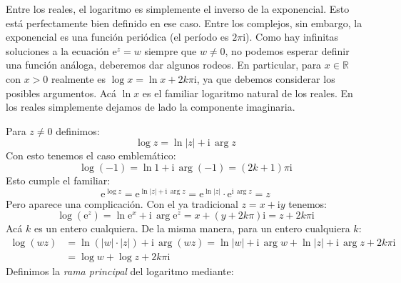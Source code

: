   Entre los reales,
  el logaritmo es simplemente el inverso de la exponencial.
  Esto está perfectamente bien definido en ese caso.
  Entre los complejos,
  sin embargo,
  la exponencial es una función periódica
  (el período es \(2 \pi \mathrm{i}\)).
  Como hay infinitas soluciones a la ecuación \(\mathrm{e}^z = w\)
  siempre que \(w \ne 0\),
  no podemos esperar definir una función análoga,
  deberemos dar algunos rodeos.
  En particular,
  para \(x \in \mathbb{R}\) con \(x > 0\)
  realmente es \(\log x = \ln x + 2 k \pi \mathrm{i}\),%
  ya que debemos considerar los posibles argumentos.
  Acá \(\ln x\) es el familiar logaritmo natural de los reales.
  En los reales
  simplemente dejamos de lado la componente imaginaria.

  Para \(z \ne 0\) definimos:
  \begin{equation}
    \label{eq:log-definition}
    \log z
      = \ln \lvert z \rvert + \mathrm{i} \, \arg z
  \end{equation}
  Con esto tenemos el caso emblemático:
  \begin{equation*}
    \log(-1)
      = \ln 1 + \mathrm{i} \, \arg(-1)
      = (2 k + 1) \pi \mathrm{i}
  \end{equation*}
  Esto cumple el familiar:
  \begin{equation*}
    \mathrm{e}^{\log z}
      = \mathrm{e}^{\ln \lvert z \rvert + \mathrm{i} \, \arg z}
      = \mathrm{e}^{\ln \lvert z \rvert}
	  \cdot \mathrm{e}^{\mathrm{i} \, \arg z}
      = z
  \end{equation*}
  Pero aparece una complicación.
  Con el ya tradicional \(z = x + \mathrm{i} y\) tenemos:
  \begin{equation*}
    \log \left( \mathrm{e}^z \right)
      = \ln \mathrm{e}^x + \mathrm{i} \, \arg \mathrm{e}^z
      = x + (y + 2 k \pi) \mathrm{i}
      = z + 2 k \pi \mathrm{i}
  \end{equation*}
  Acá \(k\) es un entero cualquiera.
  De la misma manera,
  para un entero cualquiera \(k\):
  \begin{align*}
    \log (w z)
      &= \ln (\lvert w \rvert \cdot \lvert z \rvert)
	   + \mathrm{i} \, \arg (w z)
       = \ln \lvert w \rvert + \mathrm{i} \, \arg w
	   + \ln \lvert z \rvert + \mathrm{i} \, \arg z
	   + 2 k \pi \mathrm{i} \\
      &= \log w + \log z + 2 k \pi \mathrm{i}
  \end{align*}
  Definimos la \emph{rama principal} del logaritmo mediante:%
